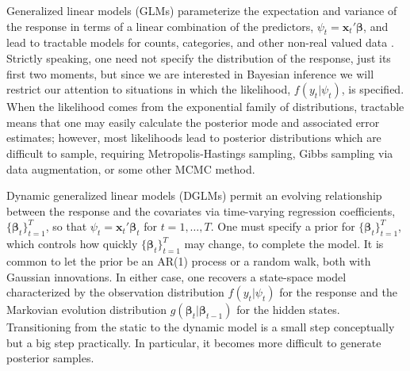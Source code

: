 \documentclass[12pt]{article}
\newcommand{\bbeta}{\boldsymbol{\beta}}
\newcommand{\vx}{\boldsymbol{x}}
\newcounter{parnum}
\newcommand{\npoint}{%
  \noindent\refstepcounter{parnum}%
  \makebox[0.5in][c]{\textbf{\arabic{parnum}.}} %
  \marginnote{\small\ttfamily\the\inputlineno}}
\renewcommand{\npoint}{}
\begin{document}
\npoint Generalized linear models (GLMs) 
parameterize the expectation and variance of the response in terms of a linear
combination of the predictors, $\psi_t = \vx_t' \bbeta$, and lead to tractable
models for counts, categories, and other non-real valued data
\citep{wedderburn-1974, mccullagh-nelder-1989}.  Strictly speaking, one need not
specify the distribution of the response, just its first two moments, but since
we are interested in Bayesian inference we will restrict our attention to
situations in which the likelihood, $f(y_t | \psi_t)$, is specified.  When the
likelihood comes from the exponential family of distributions, tractable means
that one may easily calculate the posterior mode and associated error estimates;
however, most likelihoods lead to posterior distributions which are difficult to
sample, requiring Metropolis-Hastings sampling, Gibbs sampling via data
augmentation, or some other MCMC method.

\npoint Dynamic generalized linear models (DGLMs) permit an evolving
relationship between the response and the covariates via time-varying regression
coefficients, $\{\bbeta_t\}_{t=1}^T$, so that $\psi_t = \vx_t' \bbeta_t$ for
$t=1, \ldots, T$.  One must specify a prior for $\{\bbeta_t\}_{t=1}^T$, which
controls how quickly $\{\bbeta_t\}_{t=1}^T$ may change, to complete the model.
It is common to let the prior be an AR(1) process or a random walk, both with
Gaussian innovations.  In either case, one recovers a state-space model
characterized by the observation distribution $f(y_t | \psi_t)$ for the response
and the Markovian evolution distribution $g(\bbeta_t | \bbeta_{t-1})$ for the
hidden states.  Transitioning from the static to the dynamic model is a small
step conceptually but a big step practically.  In particular, it becomes more
difficult to generate posterior samples.
\end{document}
